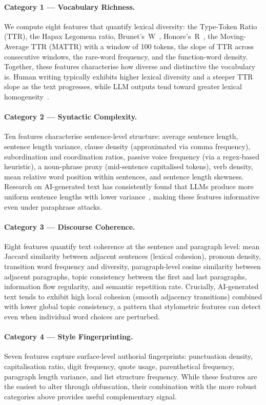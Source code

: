 \paragraph{Category 1 — Vocabulary Richness.} We compute eight features that quantify lexical
diversity: the Type-Token Ratio (TTR), the Hapax Legomena ratio, Brunet's~W~\cite{brunet:1978},
Honore's~R~\cite{honore:1979}, the Moving-Average TTR (MATTR) with a window of 100 tokens, the
slope of TTR across consecutive windows, the rare-word frequency, and the function-word density.
Together, these features characterise how diverse and distinctive the vocabulary is. Human writing
typically exhibits higher lexical diversity and a steeper TTR slope as the text progresses,
while LLM outputs tend toward greater lexical homogeneity~\cite{jakesch:2023}.

\paragraph{Category 2 — Syntactic Complexity.} Ten features characterise sentence-level structure:
average sentence length, sentence length variance, clause density (approximated via comma frequency),
subordination and coordination ratios, passive voice frequency (via a regex-based heuristic),
a noun-phrase proxy (mid-sentence capitalised tokens), verb density, mean relative word position
within sentences, and sentence length skewness. Research on AI-generated text has consistently found
that LLMs produce more uniform sentence lengths with lower variance~\cite{schuster:2020}, making
these features informative even under paraphrase attacks.

\paragraph{Category 3 — Discourse Coherence.} Eight features quantify text coherence at the
sentence and paragraph level: mean Jaccard similarity between adjacent sentences (lexical cohesion),
pronoun density, transition word frequency and diversity, paragraph-level cosine similarity
between adjacent paragraphs, topic consistency between the first and last paragraphs, information
flow regularity, and semantic repetition rate. Crucially, AI-generated text tends to exhibit
high local cohesion (smooth adjacency transitions) combined with lower global topic consistency,
a pattern that stylometric features can detect even when individual word choices are perturbed.

\paragraph{Category 4 — Style Fingerprinting.} Seven features capture surface-level authorial
fingerprints: punctuation density, capitalisation ratio, digit frequency, quote usage, parenthetical
frequency, paragraph length variance, and list structure frequency. While these features are the
easiest to alter through obfuscation, their combination with the more robust categories above
provides useful complementary signal.

